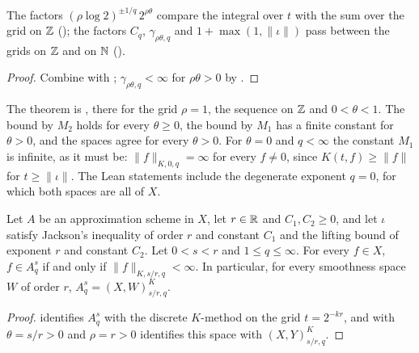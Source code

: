 The factors $(\rho \log 2)^{\pm 1/q} \, 2^{\rho\theta}$ compare the integral over $t$ with the
sum over the grid on $\mathbb{Z}$ (); the factors $C_q$,
$\gamma_{\rho\theta, q}$ and $1 + \max(1, \|\iota\|)$ pass between the grids on $\mathbb{Z}$ and on $\mathbb{N}$
().

\begin{proof}
\leanok
Combine  with ;
$\gamma_{\rho\theta, q} < \infty$ for $\rho\theta > 0$ by .
\end{proof}

The theorem is \cite[Lemma~3.1.3]{BerghLofstrom}, there for the grid $\rho = 1$, the sequence on
$\mathbb{Z}$ and $0 < \theta < 1$. The bound by $M_2$ holds for every $\theta \geq 0$, the bound by $M_1$
has a finite constant for $\theta > 0$, and the spaces agree for every $\theta > 0$. For
$\theta = 0$ and $q < \infty$ the constant $M_1$ is infinite, as it must be:
$\|f\|_{K, 0, q} = \infty$ for every $f \neq 0$, since $K(t, f) \geq \|f\|$ for
$t \geq \|\iota\|$. The Lean statements include the degenerate exponent $q = 0$, for which both
spaces are all of $X$.

\begin{corollary}
\label{cor:representation-continuous-k-method}
\leanok
{}
Let $A$ be an approximation scheme in $X$, let $r \in \mathbb{R}$ and $C_1, C_2 \geq 0$, and let
$\iota$ satisfy Jackson's inequality of order $r$ and constant $C_1$ and the lifting bound of
exponent $r$ and constant $C_2$. Let $0 < s < r$ and $1 \leq q \leq \infty$. For every
$f \in X$, $f \in A^s_q$ if and only if
$\|f\|_{K, s/r, q} < \infty$. In particular, for every smoothness space $W$ of order $r$,
$A^s_q = (X, W)^K_{s/r, q}$.
\end{corollary}

\begin{proof}
\leanok
{} identifies $A^s_q$ with the discrete $K$-method on the grid
$t = 2^{-kr}$, and  with $\theta = s/r > 0$ and
$\rho = r > 0$ identifies this space with $(X, Y)^K_{s/r, q}$.
\end{proof}

